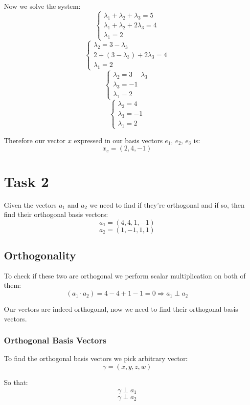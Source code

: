 \documentclass[11pt]{article}
\begin{document}
Now we solve the system:
\[
\left\{
\begin{aligned}
\lambda_1 + \lambda_2 + \lambda_3 = 5 \\
\lambda_1 + \lambda_2 + 2 \lambda_3 = 4 \\
\lambda_1 = 2
\end{aligned}
\]
\[
\left\{
\begin{aligned}
\lambda_2 = 3 - \lambda_3 \\
2 + (3 - \lambda_3) + 2 \lambda_3 = 4 \\
\lambda_1 = 2
\end{aligned}
\]
\[
\left\{
\begin{aligned}
\lambda_2 = 3 - \lambda_3 \\
\lambda_3 = -1 \\
\lambda_1 = 2
\end{aligned}
\]
\[
\left\{
\begin{aligned}
\lambda_2 = 4 \\
\lambda_3 = -1 \\
\lambda_1 = 2
\end{aligned}
\]

Therefore our vector \(x\) expressed in our basis vectors \(e_1\), \(e_2\), \(e_3\) is:
\[
x_e = (2,4,-1)
\]

\newpage
\section{Task 2}
\label{sec:org00463ae}
Given the vectors \(a_1\) and \(a_2\) we need to find if they're orthogonal and if so, then find their orthogonal basis vectors:
\[
a_1 = (4,4,1,-1)
\]
\[
a_2 = (1,-1,1,1)
\]
\subsection{Orthogonality}
\label{sec:orgcaf89d8}
To check if these two are orthogonal we perform scalar multiplication on both of them:
\[
(a_1 \cdot a_2) = 4 - 4 + 1 - 1 = 0 \Rightarrow a_1 \perp a_2
\]

Our vectors are indeed orthogonal, now we need to find their orthogonal basis vectors.
\subsubsection{Orthogonal Basis Vectors}
\label{sec:orgf2b69f0}
To find the orthogonal basis vectors we pick arbitrary vector:
\[
\gamma=(x,y,z,w)
\]

So that:
\[
\gamma \perp a_1
\]
\[
\gamma \perp a_2
\]
\end{document}
